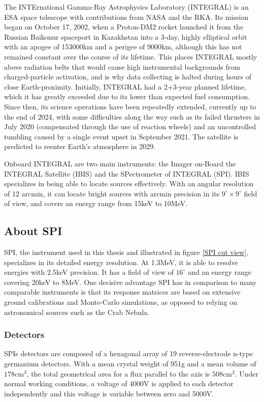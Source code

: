 \documentclass{report}
\begin{document}
The INTErnational Gamma-Ray Astrophysics Laboratory (INTEGRAL) is an ESA space telescope with contributions from NASA and the RKA. Its mission began on October 17, 2002, when a Proton-DM2 rocket launched it from the Russian Baikonur spaceport in Kazakhstan into a 3-day, highly elliptical orbit with an apogee of 153000km and a perigee of 9000km, although this has not remained constant over the course of its lifetime. This places INTEGRAL mostly above radiation belts that would cause high instrumental backgrounds from charged-particle activation, and is why data collecting is halted during hours of close Earth-proximity. Initially, INTEGRAL had a 2+3-year planned lifetime, which it has greatly exceeded due to its lower than expected fuel consumption. Since then, its science operations have been repeatedly extended, currently up to the end of 2024, with some difficulties along the way such as its failed thrusters in July 2020 (compensated through the use of reaction wheels) and an uncontrolled tumbling caused by a single event upset in September 2021. The satellite is predicted to reenter Earth's atmosphere in 2029.



Onboard INTEGRAL are two main instruments: the Imager on-Board the INTEGRAL Satellite (IBIS) and the SPectrometer of INTEGRAL (SPI). IBIS specializes in being able to locate sources effectively. With an angular resolution of 12 arcmin, it can locate bright sources with arcmin precision in its $9^\circ \times 9^\circ$ field of view, and covers an energy range from 15keV to 10MeV. 

\subsection{About SPI}




SPI, the instrument used in this thesis and illustrated in figure \ref{SPI cut view}, specializes in its detailed energy resolution. At 1.3MeV, it is able to resolve energies with 2.5keV precision. It has a field of view of $16^\circ$ and an energy range covering 20keV to 8MeV. One decisive advantage SPI has in comparison to many comparable instruments is that its response matrices are based on extensive ground calibrations and Monte-Carlo simulations, as opposed to relying on astronomical sources such as the Crab Nebula.





\subsubsection*{Detectors}
SPIs detectors are composed of a hexagonal array of 19 reverse-electrode n-type germanium detectors. With a mean crystal weight of 951g and a mean volume of $178\text{cm}^3$, the total geometrical area for a flux parallel to the axis is $508\text{cm}^2$. Under normal working conditions, a voltage of 4000V is applied to each detector independently and this voltage is variable between zero and 5000V. 
\end{document}
